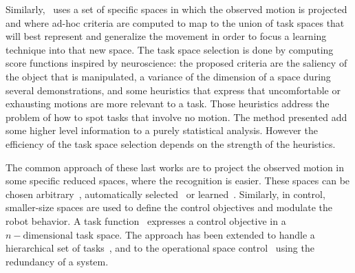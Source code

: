 \documentclass[letterpaper, 10pt, conference]{ieeeconf}      %
\begin{document}
Similarly,~\cite{muhlig09} uses a set of specific spaces
in which the observed motion is projected and where ad-hoc criteria
are computed to map to the union of task spaces that will best represent and generalize the movement in order to focus
a learning technique into that new space. The task space selection is
done by computing score functions inspired by neuroscience: the proposed criteria are
the saliency of the object that is manipulated, a variance of the dimension
of a space during several demonstrations, and some heuristics that express that
uncomfortable or exhausting motions are more relevant to a task. Those heuristics
address the problem of how to spot tasks that involve no motion. The method
presented add some higher level information to a purely statistical analysis. However
the efficiency of the task space selection depends on the strength
of the heuristics.

The common approach of these last works are to project the observed motion in some specific reduced spaces,
where the recognition is easier. These spaces can be chosen arbitrary~\cite{nakaoka07}, 
automatically selected~\cite{muhlig09} or learned~\cite{peters08}. Similarly, in control,
smaller-size spaces are used to define the control objectives and modulate the robot behavior.
A task function~\cite{samson91} expresses a control objective in a $n-\text{dimensional}$ task space.
The approach has been extended to handle a hierarchical set of tasks~\cite{siciliano91, nakamura87},
and to the operational space control~\cite{khatib87} using the redundancy of a system.


\end{document}
